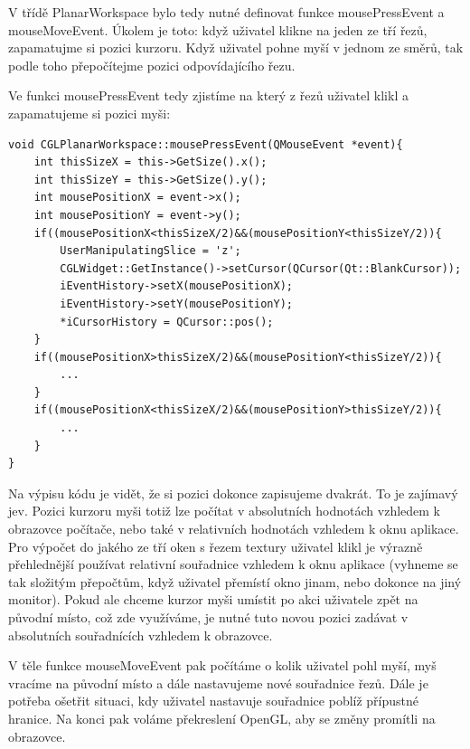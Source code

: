 V třídě PlanarWorkspace bylo tedy nutné definovat funkce mousePressEvent a mouseMoveEvent. Úkolem je toto: když uživatel klikne na jeden ze tří řezů, zapamatujme si pozici kurzoru. Když uživatel pohne myší v jednom ze směrů, tak podle toho přepočítejme pozici odpovídajícího řezu.

Ve funkci mousePressEvent tedy zjistíme na který z řezů uživatel klikl a zapamatujeme si pozici myši:

\begin{lstlisting}[label=DicomImageClass,caption={První část souboru \texttt{Window.cpp} se zdrojovým kódem třídy reprezentující okno programu.}]
void CGLPlanarWorkspace::mousePressEvent(QMouseEvent *event){
	int thisSizeX = this->GetSize().x();
	int thisSizeY = this->GetSize().y();
	int mousePositionX = event->x();
	int mousePositionY = event->y();
	if((mousePositionX<thisSizeX/2)&&(mousePositionY<thisSizeY/2)){
		UserManipulatingSlice = 'z';
		CGLWidget::GetInstance()->setCursor(QCursor(Qt::BlankCursor));
		iEventHistory->setX(mousePositionX);	
		iEventHistory->setY(mousePositionY);
		*iCursorHistory = QCursor::pos();
	}
	if((mousePositionX>thisSizeX/2)&&(mousePositionY<thisSizeY/2)){
 		...
	}
	if((mousePositionX<thisSizeX/2)&&(mousePositionY>thisSizeY/2)){
 		...	
	}
}
\end{lstlisting}

Na výpisu kódu je vidět, že si pozici dokonce zapisujeme dvakrát. To je zajímavý jev. Pozici kurzoru myši totiž lze počítat v absolutních hodnotách vzhledem k obrazovce počítače, nebo také v relativních hodnotách vzhledem k oknu aplikace. Pro výpočet do jakého ze tří oken s řezem textury uživatel klikl je výrazně přehlednější používat relativní souřadnice vzhledem k oknu aplikace (vyhneme se tak složitým přepočtům, když uživatel přemístí okno jinam, nebo dokonce na jiný monitor). Pokud ale chceme kurzor myši umístit po akci uživatele zpět na původní místo, což zde využíváme, je nutné tuto novou pozici zadávat v absolutních souřadnících vzhledem k obrazovce.

V těle funkce mouseMoveEvent pak počítáme o kolik uživatel pohl myší, myš vracíme na původní místo a dále nastavujeme nové souřadnice řezů. Dále je potřeba ošetřit situaci, kdy uživatel nastavuje souřadnice poblíž přípustné hranice. Na konci pak voláme překreslení OpenGL, aby se změny promítli na obrazovce.

